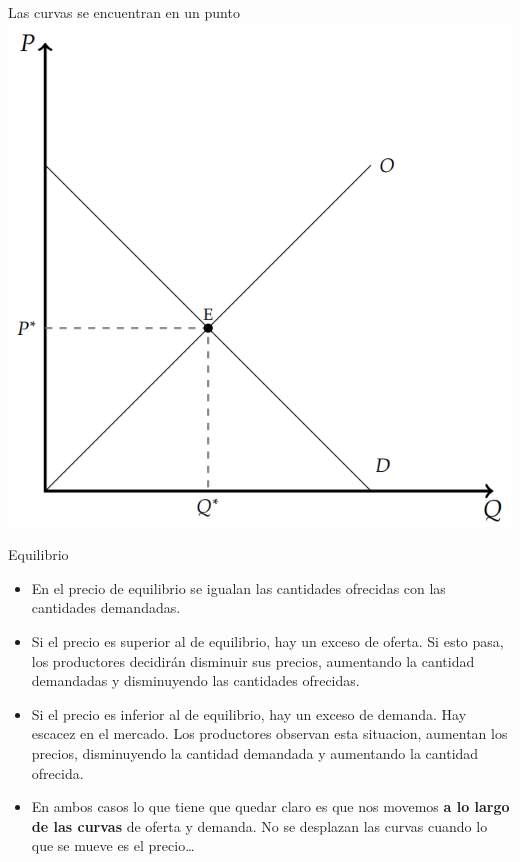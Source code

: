 \documentclass{beamer}
\begin{document}
\begin{frame}{Las curvas se encuentran en un punto}
    \centering
    \includegraphics[scale=0.6]{../Figures/C15.1.png}
\end{frame}

\begin{frame}{Equilibrio}
    \begin{itemize}
        \item En el precio de equilibrio se igualan las cantidades ofrecidas con las cantidades demandadas.
        \item Si el precio es superior al de equilibrio, hay un exceso de oferta. Si esto pasa, los productores decidirán disminuir sus precios, aumentando la cantidad demandadas y disminuyendo las cantidades ofrecidas.
        \item Si el precio es inferior al de equilibrio, hay un exceso de demanda. Hay escacez en el mercado. Los productores observan esta situacion, aumentan los precios, disminuyendo la cantidad demandada y aumentando la cantidad ofrecida.
        \item En ambos casos lo que tiene que quedar claro es que nos movemos \textbf{a lo largo de las curvas} de oferta y demanda. No se desplazan las curvas cuando lo que se mueve es el precio\dots
    \end{itemize}
\end{frame}
\end{document}
